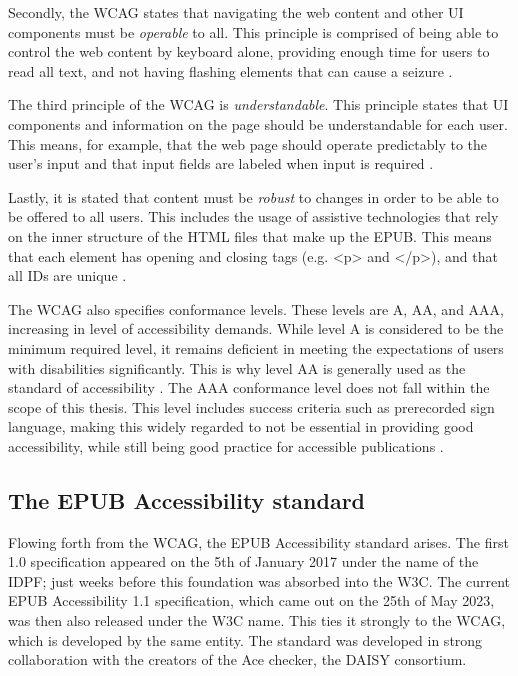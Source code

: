 Secondly, the WCAG states that navigating the web content and other UI components must be \textit{operable} to all. This principle is comprised of being able to control the web content by keyboard alone, providing enough time for users to read all text, and not having flashing elements that can cause a seizure \cite{Caldwell2008}.

The third principle of the WCAG is \textit{understandable}. This principle states that UI components and information on the page should be understandable for each user. This means, for example, that the web page should operate predictably to the user's input and that input fields are labeled when input is required \cite{Caldwell2008}.

Lastly, it is stated that content must be \textit{robust} to changes in order to be able to be offered to all users. This includes the usage of assistive technologies that rely on the inner structure of the HTML files that make up the EPUB. This means that each element has opening and closing tags (e.g. <p> and </p>), and that all IDs are unique \cite{Caldwell2008}.

The WCAG also specifies conformance levels. These levels are A, AA, and AAA, increasing in level of accessibility demands. While level A is considered to be the minimum required level, it remains deficient in meeting the expectations of users with disabilities significantly. This is why level AA is generally used as the standard of accessibility \cite{KBDaisyWCAG}. The AAA conformance level does not fall within the scope of this thesis. This level includes success criteria such as prerecorded sign language, making this widely regarded to not be essential in providing good accessibility, while still being good practice for accessible publications \cite{WCAGGuidelines, KBDaisyWCAG}.



\subsection{The EPUB Accessibility standard}
Flowing forth from the WCAG, the EPUB Accessibility standard arises. The first 1.0 specification appeared on the 5th of January 2017 under the name of the IDPF; just weeks before this foundation was absorbed into the W3C. The current EPUB Accessibility 1.1 specification, which came out on the 25th of May 2023, was then also released under the W3C name. This ties it strongly to the WCAG, which is developed by the same entity. The standard was developed in strong collaboration with the creators of the Ace checker, the DAISY consortium.

